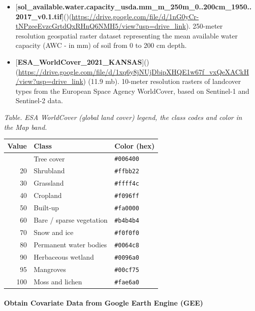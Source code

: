 \documentclass[
  10pt,
  b5paper,
  oneside]{book}
\begin{document}
\begin{itemize}
\item
  {[}\textbf{sol\_available.water.capacity\_usda.mm\_m\_250m\_0..200cm\_1950..2017\_v0.1.tif}{]}()(\url{https://drive.google.com/file/d/1nG0yCr-tNPzeeEvzcGrtdQxRHnQ6NMH5/view?usp=drive_link}). 250-meter resolution geospatial raster dataset representing the mean available water capacity (AWC - in mm) of soil from 0 to 200 cm depth.
\item
  {[}\textbf{ESA\_WorldCover\_2021\_KANSAS}{]}()(\url{https://drive.google.com/file/d/1xq6y8jNUjDbipXHQE1w67f_vxQeXACkH/view?usp=drive_link}) (11.9 mb). 10-meter resolution rasters of landcover types from the European Space Agency WorldCover, based on Sentinel-1 and Sentinel-2 data.
\end{itemize}

\emph{Table. ESA WorldCover (global land cover) legend, the class codes and color in the Map band.}

\begin{longtable}[]{@{}rll@{}}
\toprule\noalign{}
Value & Class & Color (hex) \\
\midrule\noalign{}
\endhead
\bottomrule\noalign{}
\endlastfoot
10 & Tree cover & \texttt{\#006400} \\
20 & Shrubland & \texttt{\#ffbb22} \\
30 & Grassland & \texttt{\#ffff4c} \\
40 & Cropland & \texttt{\#f096ff} \\
50 & Built-up & \texttt{\#fa0000} \\
60 & Bare / sparse vegetation & \texttt{\#b4b4b4} \\
70 & Snow and ice & \texttt{\#f0f0f0} \\
80 & Permanent water bodies & \texttt{\#0064c8} \\
90 & Herbaceous wetland & \texttt{\#0096a0} \\
95 & Mangroves & \texttt{\#00cf75} \\
100 & Moss and lichen & \texttt{\#fae6a0} \\
\end{longtable}

\paragraph*{Obtain Covariate Data from Google Earth Engine (GEE)}\label{obtain-covariate-data-from-google-earth-engine-gee}
\end{document}
